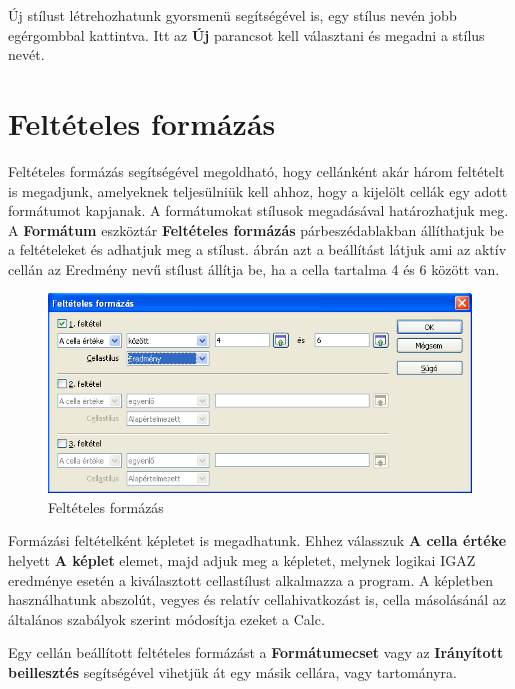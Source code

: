 Új stílust létrehozhatunk gyorsmenü segítségével is, egy
stílus nevén jobb egérgombbal kattintva. Itt az \textbf{Új}
parancsot kell választani és megadni a stílus nevét.


\section{Feltételes formázás}

Feltételes formázás segítségével megoldható, hogy
cellánként akár három feltételt is megadjunk, amelyeknek
teljesülniük kell ahhoz, hogy a kijelölt cellák egy adott
formátumot kapjanak. A formátumokat stílusok megadásával
határozhatjuk meg. A \textbf{Formátum} eszköztár
\textbf{Feltételes formázás} párbeszédablakban
állíthatjuk be a feltételeket és adhatjuk meg a stílust. 
 ábrán azt a beállítást látjuk ami az aktív cellán
az Eredmény nevű stílust állítja be, ha a cella tartalma 4
és 6 között van.

\begin{figure}[!h]
\begin{center}
\includegraphics[width=15.999cm]{oocalcv2-img159.png}
\caption{Feltételes formázás}\label{FeltételesFormázás}
\end{center}
\end{figure}

Formázási feltételként képletet is megadhatunk. Ehhez
válasszuk \textbf{A cella értéke} helyett \textbf{A képlet
}elemet, majd adjuk meg a képletet, melynek logikai IGAZ eredménye
esetén a kiválasztott cellastílust alkalmazza a program. A
képletben használhatunk abszolút, vegyes és relatív
cellahivatkozást is, cella másolásánál az általános
szabályok szerint módosítja ezeket a Calc.

Egy cellán beállított feltételes formázást a
\textbf{Formátumecset} vagy az \textbf{Irányított beillesztés}
segítségével vihetjük át egy másik cellára, vagy
tartományra.


